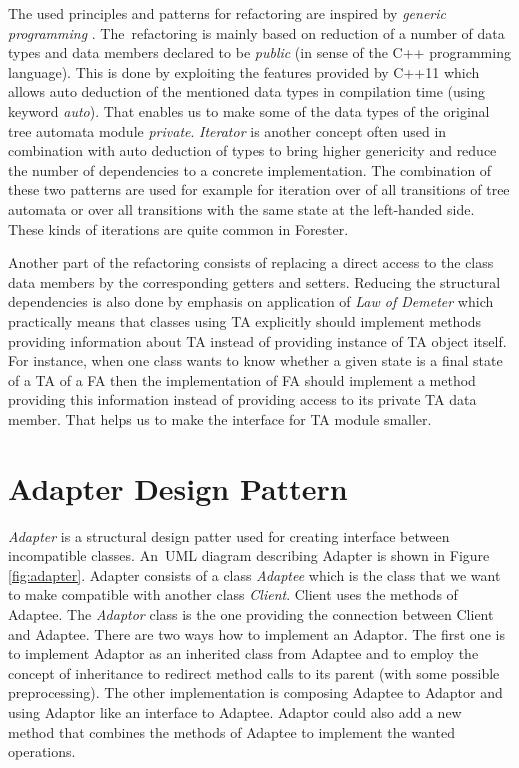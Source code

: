 The used principles and patterns for refactoring are inspired by \emph{generic programming} \cite{elop}.
The~refactoring is mainly based on reduction of a number of data types and data members declared
to be \emph{public} (in sense of the C++ programming language).
This is done by exploiting the features provided by C++11 \cite{stroustrup13}
which allows auto deduction of the mentioned data types in compilation time (using keyword \emph{auto}).
That enables us to make some of the data types of the original tree automata module \emph{private}.
\emph{Iterator} is another concept often used in combination with auto deduction of types
to bring higher genericity and reduce the number of dependencies to a concrete implementation.
The combination of these two patterns are used for example for
iteration over of all transitions of tree automata or over all transitions with
the same state at the left-handed side.
These kinds of iterations are quite common in Forester.

Another part of the refactoring consists of replacing a direct access to
the class data members by the corresponding getters and setters.
Reducing the structural dependencies is also done by emphasis on application of \emph{Law of Demeter} \cite{lod89} which practically
means that classes using TA explicitly should implement methods providing information about
TA instead of providing instance of TA object itself.
For instance, when one class wants to know whether a given state is a final state
of a TA of a FA then the implementation of FA should
implement a method providing this information instead of
providing access to its private TA data member.
That helps us to make the interface for TA module smaller.

\section{Adapter Design Pattern}
\label{sec:adapter}

\emph{Adapter} is a structural design patter \cite{gamma95} used for creating interface between incompatible classes.
An~UML diagram describing Adapter is shown in Figure \ref{fig:adapter}.
Adapter consists of a class \emph{Adaptee} which is the class that we want to make compatible with
another class \emph{Client}.
Client uses the methods of Adaptee.
The \emph{Adaptor} class is the one providing the connection between Client and Adaptee.
There are two ways how to implement an Adaptor.
The first one is to implement Adaptor as an inherited class from Adaptee
and to employ the concept of inheritance to redirect
method calls to its parent (with some possible preprocessing).
The other implementation is composing Adaptee to Adaptor and using Adaptor like an interface to Adaptee.
Adaptor could also add a new method that combines
the methods of Adaptee to implement the wanted operations.

